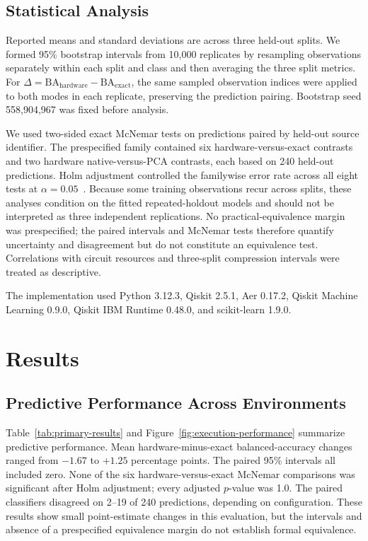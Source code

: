 \documentclass[letterpaper]{article} %
\begin{document}
\subsection{Statistical Analysis}

Reported means and standard deviations are across three held-out splits. We formed 95\% bootstrap intervals from 10,000 replicates by resampling observations separately within each split and class and then averaging the three split metrics. For $\Delta=\mathrm{BA}_{\mathrm{hardware}}-\mathrm{BA}_{\mathrm{exact}}$, the same sampled observation indices were applied to both modes in each replicate, preserving the prediction pairing. Bootstrap seed 558,904,967 was fixed before analysis.

We used two-sided exact McNemar tests on predictions paired by held-out source identifier. The prespecified family contained six hardware-versus-exact contrasts and two hardware native-versus-PCA contrasts, each based on 240 held-out predictions. Holm adjustment controlled the familywise error rate across all eight tests at $\alpha=0.05$~\cite{mcnemar1947,holm1979}. Because some training observations recur across splits, these analyses condition on the fitted repeated-holdout models and should not be interpreted as three independent replications. No practical-equivalence margin was prespecified; the paired intervals and McNemar tests therefore quantify uncertainty and disagreement but do not constitute an equivalence test. Correlations with circuit resources and three-split compression intervals were treated as descriptive.

The implementation used Python 3.12.3, Qiskit 2.5.1, Aer 0.17.2, Qiskit Machine Learning 0.9.0, Qiskit IBM Runtime 0.48.0, and scikit-learn 1.9.0.

\section{Results}

\subsection{Predictive Performance Across Environments}

Table~\ref{tab:primary-results} and Figure~\ref{fig:execution-performance} summarize predictive performance. Mean hardware-minus-exact balanced-accuracy changes ranged from $-1.67$ to $+1.25$ percentage points. The paired 95\% intervals all included zero. None of the six hardware-versus-exact McNemar comparisons was significant after Holm adjustment; every adjusted $p$-value was 1.0. The paired classifiers disagreed on 2--19 of 240 predictions, depending on configuration. These results show small point-estimate changes in this evaluation, but the intervals and absence of a prespecified equivalence margin do not establish formal equivalence.
\end{document}
